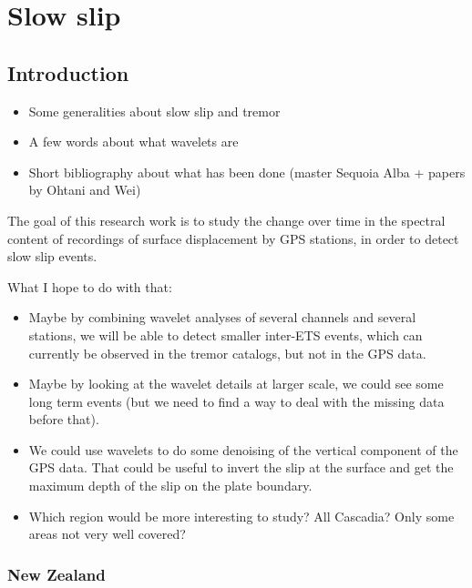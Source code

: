 \documentclass[main.tex]{subfiles}
\begin{document}
\part{Slow slip}

\chapter{Introduction}

\begin{itemize}
	\item Some generalities about slow slip and tremor
	\item A few words about what wavelets are
	\item Short bibliography about what has been done (master Sequoia Alba + papers by Ohtani and Wei)
\end{itemize}

The goal of this research work is to study the change over time in the spectral content of recordings of surface displacement by GPS stations, in order to detect slow slip events.

What I hope to do with that:

\begin{itemize}

\item Maybe by combining wavelet analyses of several channels and several stations, we will be able to detect smaller inter-ETS events, which can currently be observed in the tremor catalogs, but not in the GPS data.

\item Maybe by looking at the wavelet details at larger scale, we could see some long term events (but we need to find a way to deal with the missing data before that).

\item We could use wavelets to do some denoising of the vertical component of the GPS data. That could be useful to invert the slip at the surface and get the maximum depth of the slip on the plate boundary.

\item Which region would be more interesting to study? All Cascadia? Only some areas not very well covered?

\end{itemize} 

\section{New Zealand}
\end{document}
